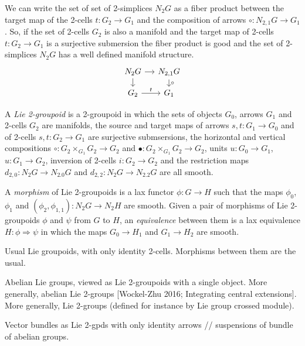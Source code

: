 We can write the set of set of 2-simplices $N_2G$ as a fiber product between the target map of the 2-cells $t\colon G_2\to G_1$ and the composition of arrows $\circ\colon N_{2,1}G\to G_1$.
So, if the set of 2-cells $G_2$ is also a manifold and the target map of 2-cells $t\colon G_2\to G_1$ is a surjective submersion the fiber product  is good and the set of 2-simplices $N_2G$ has a well defined manifold structure.
\begin{equation}
  \begin{tikzcd}[sep = small]
    N_2G \ar{r} \ar{d} & N_{2,1}G \ar{d}{\circ} \\
    G_2 \ar{r}{t} & G_1
  \end{tikzcd}
\end{equation}

A \emph{Lie 2-groupoid} is a 2-groupoid in which the sets of objects $G_0$, arrows $G_1$ and 2-cells $G_2$ are manifolds, the source and target maps of arrows $s,t\colon G_1\to G_0$ and of 2-cells $s,t\colon G_2\to G_1$ are surjective submsersions, the horizontal and vertical compositions $\circ\colon G_2\times_{G_1} G_2\to G_2$ and $\bullet\colon G_2\times_{G_1} G_2\to G_2$, units $u\colon G_0\to G_1$, $u\colon G_1\to G_2$, inversion of 2-cells $i\colon G_2\to G_2$ and the restriction maps $d_{2,0}\colon N_2G\to N_{2.0}G$ and $d_{2,2}\colon N_2G\to N_{2.2}G$ are all smooth.

A \emph{morphism} of Lie 2-groupoids is a lax functor $\phi\colon G\to H$ such that the maps $\phi_0$, $\phi_1$ and $(\phi_2,\phi_{1,1})\colon N_2G\to N_2H$ are smooth.
Given a pair of morphisms of Lie 2-groupoids $\phi$ and $\psi$ from $G$ to $H$, an \emph{equivalence} between them is a lax equivalence $H\colon\phi\Rightarrow\psi$ in which the maps $G_0\to H_1$ and $G_1\to H_2$ are smooth.

\begin{example}
Usual Lie groupoids, with only identity 2-cells. Morphisms between them are the usual.
\end{example}

\begin{example}
Abelian Lie groups, viewed as Lie 2-groupoids with a single object. More generally, abelian Lie 2-groups [Wockel-Zhu 2016; Integrating central extensions]. More generally, Lie 2-groups (defined for instance by Lie group crossed module).
\end{example}

\begin{example}
Vector bundles as Lie 2-gpds with only identity arrows // suspensions of bundle of abelian groups.
\end{example}

